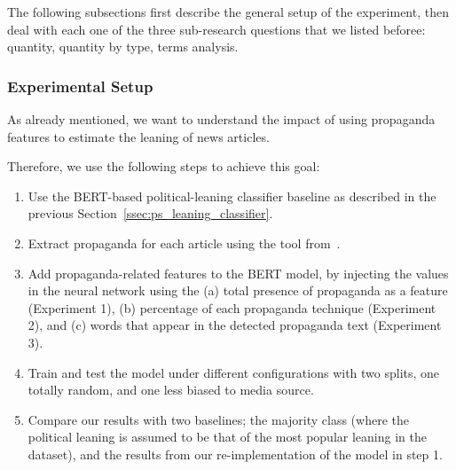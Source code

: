 The following subsections first describe the general setup of the experiment, then deal with each one of the three sub-research questions that we listed beforee: quantity, quantity by type, terms analysis.%




\subsubsection{Experimental Setup}
As already mentioned, we want to understand the impact of using propaganda features to estimate the leaning of news articles.

Therefore, we use the following steps to achieve this goal:
\begin{enumerate}
    \item Use the BERT-based political-leaning classifier baseline as described in the previous Section~\ref{ssec:ps_leaning_classifier}. %
    \item Extract propaganda for each article using the tool from~\citet{da2019fine}.
    \item Add propaganda-related features to the BERT model, by injecting the values in the neural network using the (a) total presence of propaganda as a feature (Experiment 1), (b) percentage of each propaganda technique (Experiment 2), and (c) words that appear in the detected propaganda text (Experiment 3).
    \item Train and test the model under different configurations with two splits, one totally random, and one less biased to media source.
    \item Compare our results with two baselines; the majority class (where the political leaning is assumed to be that of the most popular leaning in the dataset), and the results from our re-implementation of the model in step 1. %
\end{enumerate}


